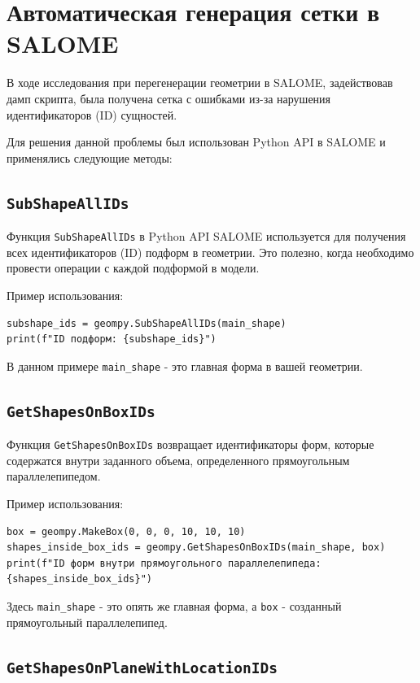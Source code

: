 \documentclass[a4paper,12pt]{extreport}
\numberwithin{equation}{chapter}
\begin{document}
\section{Автоматическая генерация сетки в SALOME}

В ходе исследования при перегенерации геометрии в SALOME, задействовав дамп скрипта, была получена сетка с ошибками из-за нарушения идентификаторов (ID) сущностей.

Для решения данной проблемы был использован Python API в SALOME и применялись следующие методы:
\subsection{\texttt{SubShapeAllIDs}}

Функция \texttt{SubShapeAllIDs} в Python API SALOME используется для получения всех идентификаторов (ID) подформ в геометрии. Это полезно, когда необходимо провести операции с каждой подформой в модели.

Пример использования:
\begin{verbatim}
subshape_ids = geompy.SubShapeAllIDs(main_shape)
print(f"ID подформ: {subshape_ids}")
\end{verbatim}

В данном примере \texttt{main\_shape} - это главная форма в вашей геометрии.

\subsection{\texttt{GetShapesOnBoxIDs}}

Функция \texttt{GetShapesOnBoxIDs} возвращает идентификаторы форм, которые содержатся внутри заданного объема, определенного прямоугольным параллелепипедом.

Пример использования:
\begin{verbatim}
box = geompy.MakeBox(0, 0, 0, 10, 10, 10)
shapes_inside_box_ids = geompy.GetShapesOnBoxIDs(main_shape, box)
print(f"ID форм внутри прямоугольного параллелепипеда: {shapes_inside_box_ids}")
\end{verbatim}

Здесь \texttt{main\_shape} - это опять же главная форма, а \texttt{box} - созданный прямоугольный параллелепипед.

\subsection{\texttt{GetShapesOnPlaneWithLocationIDs}}
\end{document}
